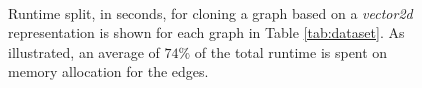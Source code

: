 \begin{figure}[hbtp]
  \centering
   \\[-2ex]
  \caption{Runtime split, in seconds, for cloning a graph based on a \textit{vector2d} representation is shown for each graph in Table \ref{tab:dataset}. As illustrated, an average of $74\%$ of the total runtime is spent on memory allocation for the edges.}
  \label{fig:vector2d-runtime}
\end{figure}
